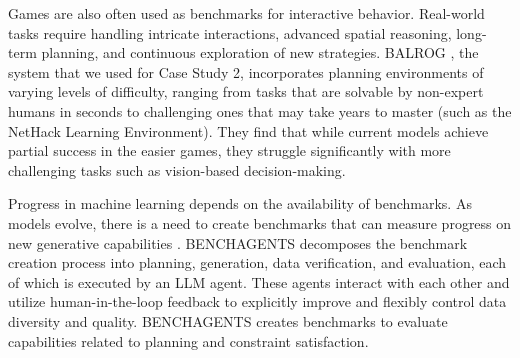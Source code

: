


Games are also often used  as benchmarks for interactive behavior. Real-world tasks require handling intricate interactions, advanced spatial reasoning, long-term planning, and continuous exploration of new strategies. 
BALROG \citep{paglieri2024balrog}, the system that we used for Case Study 2, incorporates  planning environments of varying levels of difficulty, ranging from tasks that are solvable by non-expert humans in seconds to  challenging ones that may take years to
master (such as the NetHack Learning Environment).
They find  that
while current models achieve partial success in the easier games, they struggle
significantly with more challenging tasks such as  vision-based decision-making.

Progress in machine learning depends on the availability of benchmarks. As models evolve, there is a need to create benchmarks that can measure progress on new generative capabilities \citep{butt2024benchagents}. BENCHAGENTS decomposes the benchmark creation process into planning, generation, data verification, and evaluation, each of which is executed by an LLM agent. These agents interact with each other and utilize human-in-the-loop feedback  to explicitly improve and flexibly control data diversity and quality. BENCHAGENTS creates benchmarks to evaluate capabilities related to planning and constraint satisfaction.

